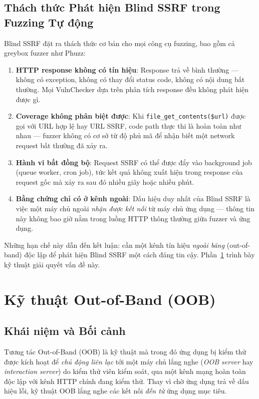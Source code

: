 \subsection{Thách thức Phát hiện Blind SSRF trong Fuzzing Tự động}

Blind SSRF đặt ra thách thức cơ bản cho mọi công cụ fuzzing, bao gồm cả
greybox fuzzer như Phuzz:

\begin{enumerate}
    \item \textbf{HTTP response không có tín hiệu}: Response trả về bình
    thường --- không có exception, không có thay đổi status code, không có
    nội dung bất thường. Mọi VulnChecker dựa trên phân tích response đều
    không phát hiện được gì.
    \item \textbf{Coverage không phân biệt được}: Khi
    \texttt{file\_get\_contents(\$url)} được gọi với URL hợp lệ hay URL SSRF,
    code path thực thi là hoàn toàn như nhau --- fuzzer không có cơ sở từ
    độ phủ mã để nhận biết một network request bất thường đã xảy ra.
    \item \textbf{Hành vi bất đồng bộ}: Request SSRF có thể được đẩy vào
    background job (queue worker, cron job), tức kết quả không xuất hiện
    trong response của request gốc mà xảy ra sau đó nhiều giây hoặc nhiều
    phút.
    \item \textbf{Bằng chứng chỉ có ở kênh ngoài}: Dấu hiệu duy nhất của
    Blind SSRF là việc một máy chủ ngoài \emph{nhận được kết nối} từ máy
    chủ ứng dụng --- thông tin này không bao giờ nằm trong luồng HTTP thông
    thường giữa fuzzer và ứng dụng.
\end{enumerate}

Những hạn chế này dẫn đến kết luận: cần một kênh tín hiệu \emph{ngoài băng}
(out-of-band) độc lập để phát hiện Blind SSRF một cách đáng tin cậy.
Phần~\ref{sec:oob} trình bày kỹ thuật giải quyết vấn đề này.

\section{Kỹ thuật Out-of-Band (OOB)}
\label{sec:oob}

\subsection{Khái niệm và Bối cảnh}

Tương tác Out-of-Band (OOB) là kỹ thuật mà trong đó ứng dụng bị kiểm thử
được kích hoạt để \emph{chủ động liên lạc} tới một máy chủ lắng nghe
(\emph{OOB server} hay \emph{interaction server}) do kiểm thử viên kiểm soát,
qua một kênh mạng hoàn toàn độc lập với kênh HTTP chính đang kiểm thử. Thay
vì chờ ứng dụng trả về dấu hiệu lỗi, kỹ thuật OOB lắng nghe các kết nối
\emph{đến từ} ứng dụng mục tiêu.

